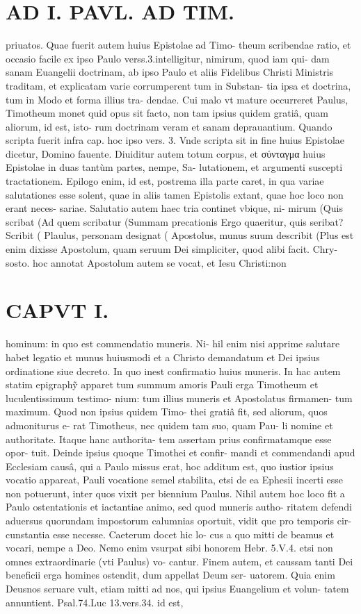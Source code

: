\documentclass{article}
\begin{document}
\begin{pages}
\section*{AD I. PAVL. AD TIM. }
\marginpar{[ p.2 ]}priuatos. Quae fuerit autem huius Epistolae ad Timo- theum scribendae ratio, et occasio facile ex ipso Paulo verss.3.intelligitur, nimirum, quod iam qui- dam sanam Euangelii doctrinam, ab ipso Paulo et aliis Fidelibus Christi Ministris traditam, et explicatam varie corrumperent tum in Substan- tia ipsa et doctrina, tum in Modo et forma illius tra- dendae. Cui malo vt mature occurreret Paulus, Timotheum monet quid opus sit facto, non tam ipsius quidem gratiâ, quam aliorum, id est, isto- rum doctrinam veram et sanam deprauantium. Quando scripta fuerit infra cap. hoc ipso vers. 3. Vnde scripta sit in fine huius Epistolae dicetur, Domino fauente. Diuiditur autem totum corpus, et σύνταγμα huius Epistolae in duas tantùm partes, nempe, Sa- lutationem, et argumenti suscepti tractationem. Epilogo enim, id est, postrema illa parte caret, in qua variae salutationes esse solent, quae in aliis tamen Epistolis extant, quae hoc loco non erant neces- sariae. Salutatio autem haec tria continet vbique, ni- mirum (Quis scribat (Ad quem scribatur (Summam precationis Ergo quaeritur, quis seribat? Scribit ( Plaulus, personam designat ( Apostolus, munus suum describit (Plus est enim dixisse Apostolum, quam seruum Dei simpliciter, quod alibi facit. Chry- sosto. hoc annotat Apostolum autem se vocat, et Iesu Christi:non 
\section*{CAPVT  I. }
\marginpar{[ p.3 ]}hominum: in quo est commendatio muneris. Ni- hil enim nisi apprime salutare habet legatio et munus huiusmodi et a Christo demandatum et Dei ipsius ordinatione siue decreto. In quo inest confirmatio huius muneris. In hac autem statim epigraphỹ apparet tum summum amoris Pauli erga Timotheum et luculentissimum testimo- nium: tum illius muneris et Apostolatus firmamen- tum maximum. Quod non ipsius quidem Timo- thei gratiâ fit, sed aliorum, quos admoniturus e- rat Timotheus, nec quidem tam suo, quam Pau- li nomine et authoritate. Itaque hanc authorita- tem assertam prius confirmatamque esse opor- tuit. Deinde ipsius quoque Timothei et confir- mandi et commendandi apud Ecclesiam causâ, qui a Paulo missus erat, hoc additum est, quo iustior ipsius vocatio appareat, Pauli vocatione semel stabilita, etsi de ea Ephesii incerti esse non potuerunt, inter quos vixit per biennium Paulus. Nihil autem hoc loco fit a Paulo ostentationis et iactantiae animo, sed quod muneris autho- ritatem defendi aduersus quorundam impostorum calumnias oportuit, vidit que pro temporis cir- cunstantia esse necesse. Caeterum docet hic lo- cus a quo mitti de beamus et vocari, nempe a Deo. Nemo enim vsurpat sibi honorem Hebr. 5.V.4. etsi non omnes extraordinarie (vti Paulus) vo- cantur. Finem autem, et caussam tanti Dei beneficii erga homines ostendit, dum appellat Deum ser- uatorem. Quia enim Deusnos seruare vult, etiam mitti ad nos, qui ipsius Euangelium et volun- tatem annuntient. Psal.74.Luc 13.vers.34. id est, 

\end{pages}
\end{document}
